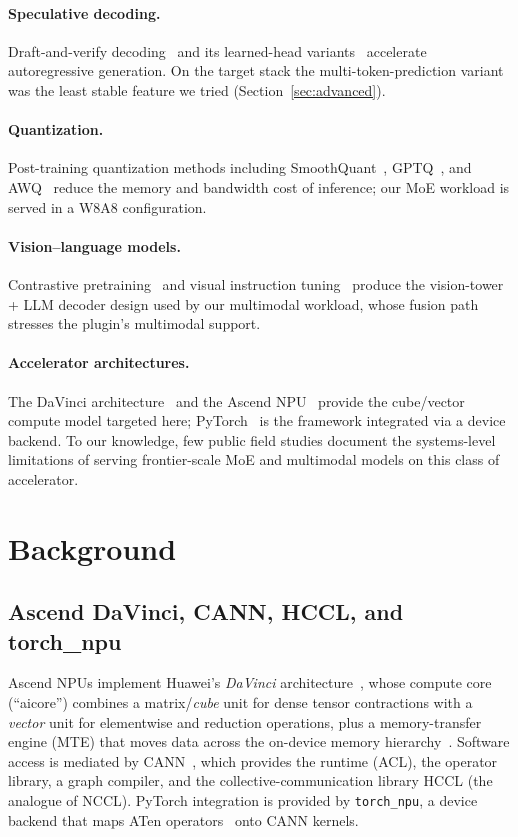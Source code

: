\documentclass{article}
\newcommand{\code}[1]{\texttt{#1}}
\begin{document}
\paragraph{Speculative decoding.} Draft-and-verify decoding~\cite{speculative}
and its learned-head variants~\cite{medusa,eagle} accelerate autoregressive
generation. On the target stack the multi-token-prediction variant was the least
stable feature we tried (Section~\ref{sec:advanced}).

\paragraph{Quantization.} Post-training quantization methods including
SmoothQuant~\cite{smoothquant}, GPTQ~\cite{gptq}, and AWQ~\cite{awq} reduce the
memory and bandwidth cost of inference; our MoE workload is served in a W8A8
configuration.

\paragraph{Vision--language models.} Contrastive pretraining~\cite{clip} and
visual instruction tuning~\cite{llava,qwen2vl} produce the vision-tower + LLM
decoder design used by our multimodal workload, whose fusion path stresses the
plugin's multimodal support.

\paragraph{Accelerator architectures.} The DaVinci
architecture~\cite{davinci} and the Ascend NPU~\cite{ascendhpca} provide the
cube/vector compute model targeted here; PyTorch~\cite{pytorch} is the framework
integrated via a device backend. To our knowledge, few public field studies
document the systems-level limitations of serving frontier-scale MoE and
multimodal models on this class of accelerator.

\section{Background}
\label{sec:background}

\subsection{Ascend DaVinci, CANN, HCCL, and torch\_npu}
Ascend NPUs implement Huawei's \emph{DaVinci} architecture~\cite{davinci}, whose
compute core (``aicore'') combines a matrix/\emph{cube} unit for dense tensor
contractions with a \emph{vector} unit for elementwise and reduction operations,
plus a memory-transfer engine (MTE) that moves data across the on-device memory
hierarchy~\cite{ascendhpca}. Software access is mediated by CANN~\cite{cann},
which provides the runtime (ACL), the operator library, a graph compiler, and the
collective-communication library HCCL (the analogue of NCCL). PyTorch
integration is provided by \code{torch\_npu}, a device backend that maps ATen
operators~\cite{pytorch} onto CANN kernels.
\end{document}
